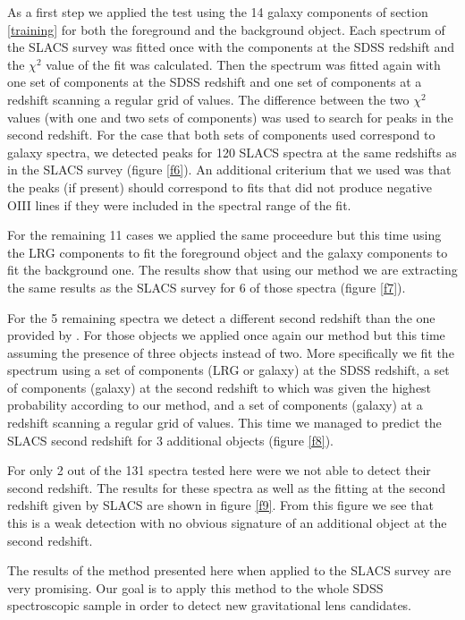 \documentclass[12pt,preprint]{aastex}
\begin{document}
As a first step we applied the test using the 14 galaxy components of section \ref{training} for both the foreground and the background object. Each spectrum of the SLACS survey was fitted once with the components at the SDSS redshift and the $\chi^2$ value of the fit was calculated. Then the spectrum was fitted again with one set of components at the SDSS redshift and one set of components at a redshift scanning a regular grid of values. The difference between the two $\chi^2$ values (with one and two sets of components) was used to search for peaks in the second redshift. For the case that both sets of components used correspond to galaxy spectra, we detected peaks for 120 SLACS spectra at the same redshifts as in the SLACS survey (figure \ref{f6}). An additional criterium that we used was that the peaks (if present) should correspond to fits that did not produce negative OIII lines if they were included in the spectral range of the fit.

For the remaining 11 cases we applied the same proceedure but this time using the LRG components to fit the foreground object and the galaxy components to fit the background one. The results show that using our method we are extracting the same results as the SLACS survey for 6 of those spectra (figure \ref{f7}).

For the 5 remaining spectra we detect a different second redshift than
the one provided by \cite{bolton}. For those objects we applied once
again our method but this time assuming the presence of three objects
instead of two. More specifically we fit the spectrum using a set of
components (LRG or galaxy) at the SDSS redshift, a set of components
(galaxy) at the second redshift to which was given the highest
probability according to our method, and a set of components (galaxy)
at a redshift scanning a regular grid of values. This time we managed
to predict the SLACS second redshift for 3 additional objects (figure
\ref{f8}).

For only 2 out of the 131 spectra tested here were we not able to detect their second redshift. The results for these spectra as well as the fitting at the second redshift given by SLACS are shown in figure \ref{f9}. From this figure we see that this is a weak detection with no obvious signature of an additional object at the second redshift.

The results of the method presented here when applied to the SLACS survey are very promising. Our goal is to apply this method to the whole SDSS spectroscopic sample in order to detect new gravitational lens candidates.
\end{document}
